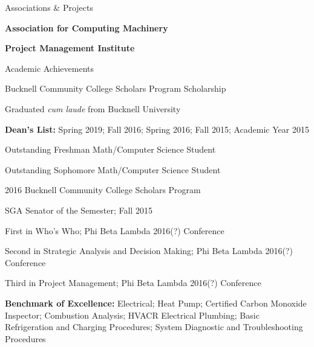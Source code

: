 \documentclass{resume} %
\begin{document}

\begin{rSection}{Associations \& Projects} \itemsep -2pt


\item {\bf Association for Computing Machinery}
\item {\bf Project Management Institute}


\end{rSection}


\begin{rSection}{Academic Achievements} \itemsep -2pt
\item Bucknell Community College Scholars Program Scholarship
\item Graduated {\it cum laude} from Bucknell University
\item {\bf Dean's List:} Spring 2019; Fall 2016; Spring 2016; Fall 2015; Academic Year 2015
\item Outstanding Freshman Math/Computer Science Student
\item Outstanding Sophomore Math/Computer Science Student
\item 2016 Bucknell Community College Scholars Program
\item SGA Senator of the Semester; Fall 2015
\item First in Who's Who; Phi Beta Lambda 2016(?) Conference
\item Second in Strategic Analysis and Decision Making; Phi Beta Lambda 2016(?) Conference
\item Third in Project Management; Phi Beta Lambda 2016(?) Conference
\item {\bf Benchmark of Excellence:} Electrical; Heat Pump; Certified Carbon Monoxide Inspector; Combustion Analysis; HVACR Electrical Plumbing; Basic Refrigeration and Charging Procedures; System Diagnostic and Troubleshooting Procedures


\end{rSection}

\end{document}
